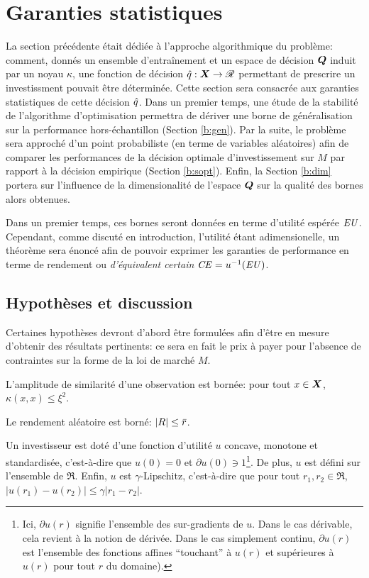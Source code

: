 \section{Garanties statistiques}
\label{sec:bound}

La section précédente était dédiée à l'approche algorithmique du problème: comment, donnés
un ensemble d'entraînement et un espace de décision $\bm Q$ induit par un noyau $\kappa$, une
fonction de décision $\hat q:\bm{X} \to \mathscr{R}$ permettant de prescrire un investissment pouvait être
déterminée. Cette section sera consacrée aux garanties statistiques de cette
décision $\hat q$. Dans un premier temps, une étude de la stabilité de l'algorithme d'optimisation
permettra de dériver une borne de généralisation sur la performance hors-échantillon
(Section \ref{b:gen}). Par la suite, le problème sera approché d'un point probabiliste (en
terme de variables aléatoires) afin de comparer les performances de la décision optimale
d'investissement sur $M$ par rapport à la décision empirique (Section
\ref{b:sopt}). Enfin, la Section \ref{b:dim} portera sur l'influence de la dimensionalité
de l'espace $\bm Q$ sur la qualité des bornes alors obtenues. 

Dans un premier temps, ces bornes seront données en terme d'utilité espérée
$\operatorname{\mbox{\textit{EU}}}$. Cependant, comme discuté en introduction, l'utilité étant adimensionelle, un
théorème sera énoncé afin de pouvoir exprimer les garanties de performance en terme de
rendement ou \textit{d'équivalent certain} $\operatorname{\mbox{\textit{CE}}} = u^{-1}(\operatorname{\mbox{\textit{EU}}})$. 


\subsection{Hypothèses et discussion}

Certaines hypothèses devront d'abord être formulées afin d'être en mesure d'obtenir des
résultats pertinents: ce sera en fait le prix à payer pour l'absence de contraintes sur la
forme de la loi de marché $M$.

\begin{assumption}
  L'amplitude de similarité d'une observation est bornée: pour tout $x \in \bm{X}$,
  $\kappa(x,x) \leq \xi^2$.
\end{assumption}
\begin{assumption}
  Le rendement aléatoire est borné: $|R| \leq \bar r$.
\end{assumption}
\begin{assumption}
  \label{hyp:lip}
  Un investisseur est doté d'une fonction d'utilité $u$ concave, monotone et standardisée,
  c'est-à-dire que $u(0) = 0$ et $\partial u(0) \ni 1$\footnote{Ici, $\partial u(r)$ signifie l'ensemble
    des sur-gradients de $u$. Dans le cas dérivable, cela revient à la notion de
    dérivée. Dans le cas simplement continu, $\partial u(r)$ est l'ensemble des fonctions affines
    ``touchant'' à $u(r)$ et supérieures à $u(r)$ pour tout $r$ du domaine).}. De plus,
  $u$ est défini sur l'ensemble de $\Re$. Enfin, $u$ est $\gamma$-Lipschitz, c'est-à-dire que
  pour tout $r_1,r_2 \in \Re$, $|u(r_1) - u(r_2)| \leq \gamma|r_1-r_2|$.
\end{assumption}

